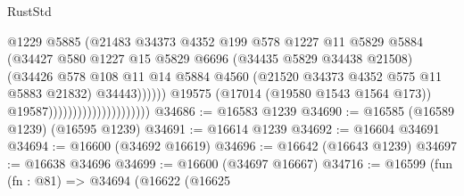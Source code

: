 \begin{lexlean}{RustStd}
\begin{coremodule}
                                                    @1229
                                                    @5885
                                                    (@21483
                                                      @34373
                                                      @4352
                                                      @199
                                                      @578
                                                      @1227
                                                      @11
                                                      @5829
                                                      @5884
                                                      (@34427
                                                        @580
                                                        @1227
                                                        @15
                                                        @5829
                                                        @6696
                                                        (@34435 @5829 @34438 @21508)
                                                        (@34426
                                                          @578
                                                          @108
                                                          @11
                                                          @14
                                                          @5884
                                                          @4560
                                                          (@21520
                                                            @34373
                                                            @4352
                                                            @575
                                                            @11
                                                            @5883
                                                            @21832)
                                                          @34443))))))
                                              @19575
                                              (@17014 (@19580 @1543 @1564 @173))
                                              @19587)))))))))))))))))))))
@34686 := @16583 @1239
@34690 := @16585 (@16589 @1239) (@16595 @1239)
@34691 := @16614 @1239
@34692 := @16604 @34691
@34694 := @16600 (@34692 @16619)
@34696 := @16642 (@16643 @1239)
@34697 := @16638 @34696
@34699 := @16600 (@34697 @16667)
@34716 := @16599
    (fun (fn : @81) =>
    @34694
      (@16622
        (@16625

\end{coremodule}
\end{lexlean}
